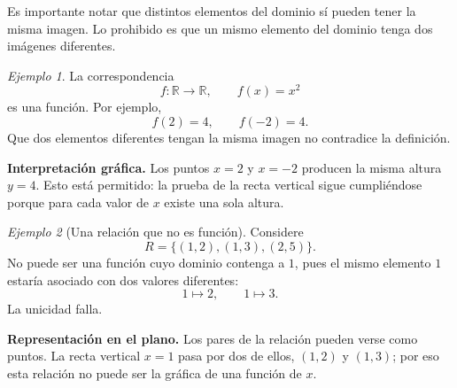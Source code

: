 \documentclass[12pt]{article}
\theoremstyle{remark}
\newtheorem{ejemplo}{Ejemplo}[section]
\newcommand{\R}{\mathbb{R}}
\begin{document}
Es importante notar que distintos elementos del dominio sí pueden tener la misma imagen. Lo prohibido es que un mismo elemento del dominio tenga dos imágenes diferentes.

\begin{ejemplo}
La correspondencia
\[
f:\R\to\R,\qquad f(x)=x^2
\]
es una función. Por ejemplo,
\[
f(2)=4,\qquad f(-2)=4.
\]
Que dos elementos diferentes tengan la misma imagen no contradice la
definición.

\textbf{Interpretación gráfica.} Los puntos $x=2$ y $x=-2$ producen la misma
altura $y=4$. Esto está permitido: la prueba de la recta vertical sigue
cumpliéndose porque para cada valor de $x$ existe una sola altura.
\begin{center}
\end{center}
\end{ejemplo}

\begin{ejemplo}[Una relación que no es función]
Considere
\[
R=\{(1,2),(1,3),(2,5)\}.
\]
No puede ser una función cuyo dominio contenga a $1$, pues el mismo elemento $1$ estaría asociado con dos valores diferentes:
\[
1\mapsto2,\qquad 1\mapsto3.
\]
La unicidad falla.

\textbf{Representación en el plano.} Los pares de la relación pueden verse como
puntos. La recta vertical $x=1$ pasa por dos de ellos, $(1,2)$ y $(1,3)$;
por eso esta relación no puede ser la gráfica de una función de $x$.
\begin{center}
\end{center}
\end{ejemplo}
\end{document}
